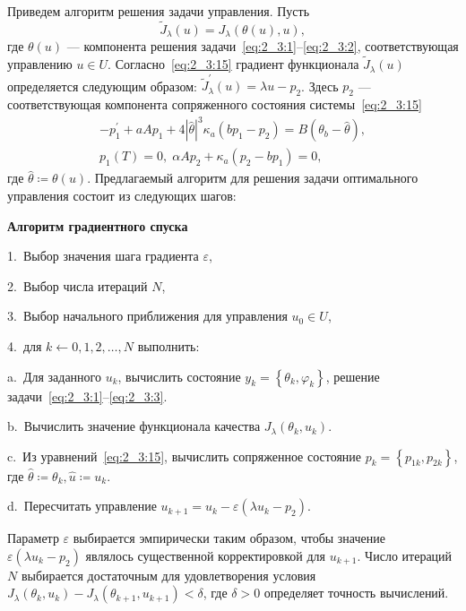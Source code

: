 Приведем алгоритм решения задачи управления.
Пусть
\[
    \widetilde{J}_{\lambda}(u)=J_{\lambda}(\theta(u), u),
\]
где $\theta(u)$ — компонента решения
задачи~\eqref{eq:2_3:1}--\eqref{eq:2_3:2},
соответствующая управлению $u \in U$.
Согласно~\eqref{eq:2_3:15} градиент функционала
$\widetilde{J}_{\lambda}(u)$ определяется
следующим образом: $\widetilde{J}_{\lambda}^{\prime}(u) = \lambda u-p_{2}$.
Здесь $p_{2}$ — соответствующая компонента сопряженного
состояния системы~\eqref{eq:2_3:15}
\begin{gather*}
    -p_{1}^{\prime}+a A p_{1}+4|\widehat{\theta}|^{3} \kappa_{a}\left(b p_{1}
    -p_{2}\right)=B\left(\theta_{b}-\widehat{\theta}\right), \\
    p_{1}(T)=0,\; \alpha A p_{2}+\kappa_{a}\left(p_{2}-b p_{1}\right)=0,
\end{gather*}
где $\widehat{\theta}\coloneqq\theta(u)$.
Предлагаемый алгоритм для решения задачи оптимального управления
состоит из следующих шагов:

\textbf{Алгоритм градиентного спуска}

1.\ Выбор значения шага градиента $\varepsilon$,

2.\ Выбор числа итераций $N$,

3.\ Выбор начального приближения для управления $u_{0} \in U$,

4.\ для $k \leftarrow 0,1,2, \ldots, N$ выполнить:

\hspace{1cm} a.\ Для заданного $u_{k}$, вычислить состояние
$y_{k}=\left\{\theta_{k}, \varphi_{k}\right\}$, решение
задачи~\eqref{eq:2_3:1}--\eqref{eq:2_3:3}.

\hspace{1cm} b.\ Вычислить значение функционала качества
$J_{\lambda}\left(\theta_{k}, u_{k}\right)$.

\hspace{1cm} c.\ Из уравнений~\eqref{eq:2_3:15}, вычислить сопряженное
состояние $p_{k}=\left\{p_{1 k}, p_{2 k}\right\}$,
где $\widehat{\theta} \coloneqq \theta_{k}, \widehat{u} \coloneqq u_{k}$.

\hspace{1cm} d.\ Пересчитать управление
$u_{k+1}=u_{k}-\varepsilon\left(\lambda u_{k}-p_{2}\right).$

Параметр $\varepsilon$ выбирается эмпирически таким образом, чтобы
значение $\varepsilon\left(\lambda u_{k}-p_{2}\right)$ являлось
существенной корректировкой для $u_{k+1}$.
Число итераций $N$ выбирается достаточным для
удовлетворения условия $J_{\lambda}\left(\theta_{k}, u_{k}\right)
-J_{\lambda}\left(\theta_{k+1}, u_{k+1}\right)<\delta$, где $\delta>0$
определяет точность вычислений.

